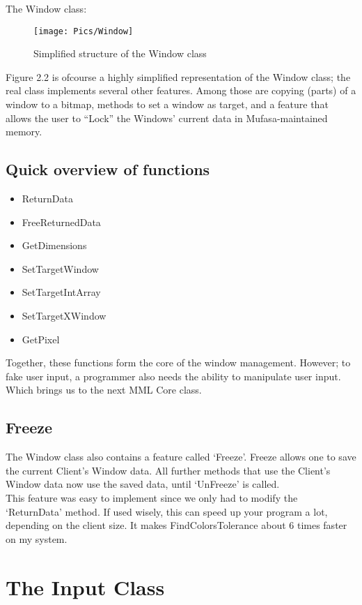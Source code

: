 \documentclass[a4paper, 10pt]{report} %
\begin{document}
The Window class:

\begin{figure}[ht]
	\texttt{[image: Pics/Window]}
	\caption{Simplified structure of the Window class}
\end{figure}

Figure 2.2 is ofcourse a highly simplified representation of the Window class;
the real class implements several other features. Among those are copying
(parts) of a window to a bitmap, methods to set a window as target, and
a feature that allows the user to ``Lock'' the Windows' current data in
Mufasa-maintained memory. \\

\subsection{Quick overview of functions}

\begin{itemize}
	\item ReturnData
	\item FreeReturnedData
	\item GetDimensions
	\item SetTargetWindow
	\item SetTargetIntArray
	\item SetTargetXWindow
	\item GetPixel
\end{itemize}

Together, these functions form the core of the window management.
However; to fake user input, a programmer also needs the ability to 
manipulate user input. Which brings us to the next MML Core class.

\subsection{Freeze}

The Window class also contains a feature called `Freeze'.
Freeze allows one to save the current Client's Window data.
All further methods that use the Client's Window data now use the saved
data, until `UnFreeze' is called. \\

This feature was easy to implement since we only had to modify the
`ReturnData' method. If used wisely, this can speed up your program
a lot, depending on the client size. It makes FindColorsTolerance about
6 times faster on my system.

\section{The Input Class}
\end{document}
